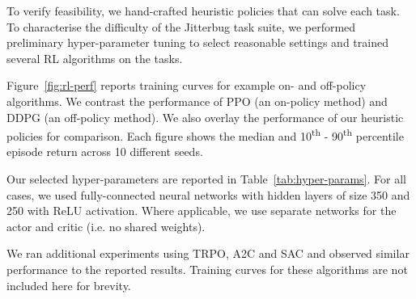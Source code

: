\documentclass[letterpaper, 10 pt, conference]{ieeeconf}
\newcommand{\rowstyle}[1]{\gdef\currentrowstyle{#1}%
    #1\ignorespaces
}
\begin{document}
\begin{table}[t]
{
    }
    
\end{table}

To verify feasibility, we hand-crafted heuristic policies that can solve each task.
To characterise the difficulty of the Jitterbug task suite, we performed preliminary hyper-parameter tuning to select reasonable settings and trained several RL algorithms on the tasks.

Figure~\ref{fig:rl-perf} reports training curves for example on- and off-policy algorithms.
We contrast the performance of PPO (an on-policy method) and DDPG (an off-policy method).
We also overlay the performance of our heuristic policies for comparison.
Each figure shows the median and 10\textsuperscript{th} - 90\textsuperscript{th} percentile episode return across 10 different seeds.

Our selected hyper-parameters are reported in Table~\ref{tab:hyper-params}.
For all cases, we used fully-connected neural networks with hidden layers of size 350 and 250 with ReLU activation.
Where applicable, we use separate networks for the actor and critic (i.e. no shared weights).

We ran additional experiments using TRPO, A2C and SAC and observed similar performance to the reported results.
Training curves for these algorithms are not included here for brevity.
\end{document}
